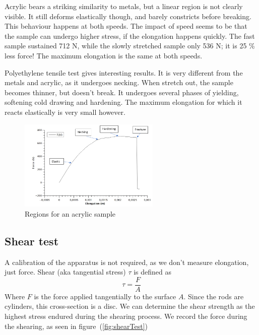 \documentclass{scrartcl}
\begin{document}
Acrylic bears a striking similarity to metals, but a linear region is not clearly visible. It still deforms elastically though, and barely constricts before breaking. This behaviour happens at both speeds. The impact of speed seems to be that the sample can undergo higher stress, if the elongation happens quickly. The fast sample sustained 712 N, while the slowly stretched sample only 536 N; it is 25 \% less force! The maximum elongation is the same at both speeds.

Polyethylene tensile test gives interesting results. It is very different from the metals and acrylic, as it undergoes necking. When stretch out, the sample becomes thinner, but doesn't break. It undergoes several phases of yielding, softening cold drawing and hardening. The maximum elongation for which it reacts elastically is very small however.

\begin{figure}[!ht]
    \centering
    \includegraphics[width=0.6\textwidth]{Tensile/annotated_acrylic(1).png}
    \caption{Regions for an acrylic sample}
    \label{fig:annotated_acrylic}
\end{figure}
\FloatBarrier

\subsection{Shear test}
A calibration of the apparatus is not required, as we don't measure elongation, just force. Shear (aka tangential stress) $\tau$ is defined as \begin{equation}
    \tau = \frac{F}{A}
\end{equation} Where $F$ is the force applied tangentially to the surface $A$. Since the rods are cylinders, this cross-section is a disc. We can determine the shear strength as the highest stress endured during the shearing process. We record the force during the shearing, as seen in figure~(\ref{fig:shearTest})
\end{document}
